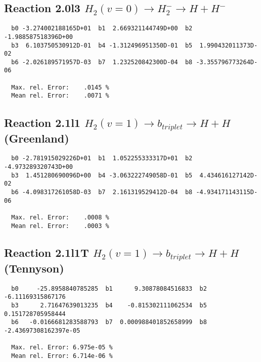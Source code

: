 \documentclass[12pt]{article}
\begin{document}
\subsection{
Reaction 2.0l3
 $ H_2(v=0) \rightarrow H_2^- \rightarrow H + H^-$
}


\begin{small}\begin{verbatim}
  b0 -3.274002188165D+01  b1  2.669321144749D+00  b2 -1.988587518396D+00
  b3  6.103750530912D-01  b4 -1.312496951350D-01  b5  1.990432011373D-02
  b6 -2.026189571957D-03  b7  1.232520842300D-04  b8 -3.355796773264D-06

  Max. rel. Error:    .0145 %
  Mean rel. Error:    .0071 %
\end{verbatim}\end{small}

\newpage
\subsection{
Reaction 2.1l1
$ H_2(v=1) \rightarrow b_{triplet}\rightarrow H + H $ (Greenland) 
}


\begin{small}\begin{verbatim}
  b0 -2.781915029226D+01  b1  1.052255333317D+01  b2 -4.973289320743D+00
  b3  1.451280690096D+00  b4 -3.063222749058D-01  b5  4.434616127142D-02
  b6 -4.098317261058D-03  b7  2.161319529412D-04  b8 -4.934171143115D-06

  Max. rel. Error:    .0008 %
  Mean rel. Error:    .0003 %

\end{verbatim}\end{small}


\subsection{
Reaction 2.1l1T
$  H_2(v=1) \rightarrow b_{triplet}\rightarrow H + H $ (Tennyson)
}

\begin{small}\begin{verbatim}
  b0     -25.8958840785285  b1      9.30878084516833  b2     -6.11169315867176
  b3      2.71647639013235  b4    -0.815302111062534  b5     0.151728705958444
  b6   -0.0166681283588793  b7  0.000988401852658999  b8 -2.43697308162397e-05

  Max. rel. Error: 6.975e-05 %
  Mean rel. Error: 6.714e-06 %
\end{verbatim}\end{small}
\end{document}
